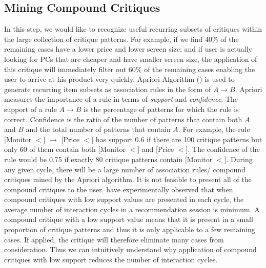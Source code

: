 \subsection{Mining Compound Critiques}
In this step, we would like to recognize useful recurring subsets of critiques within the large collection of critique patterns.
For example, if we find 40\% of the remaining cases have a lower price and lower screen size; and if user is actually looking for PCs that are cheaper and have smaller screen size, the application of this critique will immediately filter out 60\% of the remaining cases enabling the user to arrive at his product very quickly.
Apriori Algorithm (\cite{aprioriAlgo}) is used to generate recurring item subsets as association rules in the form of $A \rightarrow B$.
Apriori measures the importance of a rule in terms of \textit{support} and \textit{confidence}.
The support of a rule $A \rightarrow B$ is the percentage of patterns for which the rule is correct.
Confidence is the ratio of the number of patterns that contain both $A$ and $B$ and the total number of patterns that contain $A$.
For example, the rule [Monitor $<$] $\rightarrow$ [Price $<$] has support 0.6 if there are 100 critique patterns but only 60 of them contain both [Monitor $<$] and [Price $<$]. 
The confidence of the rule would be 0.75 if exactly 80 critique patterns contain [Monitor $<$].
During any given cycle, there will be a large number of association rules/ compound critiques mined by the Apriori algorithm.
It is not feasible to present all of the compound critiques to the user.
\cite{mccarthy2004dynamic} have experimentally observed that when compound critiques with low support values are presented in each cycle, the average number of interaction cycles in a recommendation session is minimum.
A compound critique with a low support value means that it is present in a small proportion of critique patterns and thus it is only applicable to a few remaining cases. 
If applied, the critique will therefore eliminate many cases from consideration.
Thus we can intuitively understand why application of compound critiques with low support reduces the number of interaction cycles.



